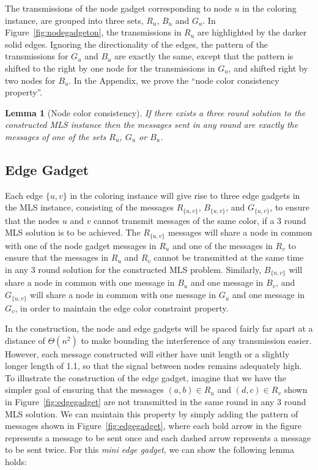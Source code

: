\documentclass{article}
\newtheorem{lemma}{Lemma}
\begin{document}
The transmissions of the node gadget corresponding to node $u$ in the coloring instance, are grouped into three sets, $R_u$, $B_u$ and $G_u$. In Figure~\ref{fig:nodegadgeton}, the transmissions in $R_u$ are highlighted by the darker solid edges.  Ignoring the directionality of the edges, the pattern of the transmissions for $G_u$ and $B_u$ are exactly the same, except that the pattern is shifted to the right by one node for the transmissions in $G_u$, and shifted right by two nodes for $B_u$. In the Appendix, we prove the ``node color consistency property''.

\begin{lemma}[Node color consistency]
If there exists a three round solution to the constructed MLS instance then the messages sent in any round are exactly the messages of one of the sets $R_u$, $G_u$ or $B_u$.
\end{lemma}


\subsection{Edge Gadget}
Each edge $\{u,v\}$ in the coloring instance will give rise to three edge gadgets in the MLS instance, consisting of the messages $R_{\{u,v\}}$, $B_{\{u,v\}}$, and $G_{\{u,v\}}$, to ensure that the nodes $u$ and $v$ cannot transmit messages of the same color, if a 3 round MLS solution is to be achieved.  The $R_{\{u,v\}}$ messages will share a node in common with one of the node gadget messages in $R_u$ and one of the messages in $R_v$ to ensure that the messages in $R_u$ and $R_v$ cannot be transmitted at the same time in any 3 round solution for the constructed MLS problem.  Similarly, $B_{\{u,v\}}$ will share a node in common with one message in $B_u$ and one message in $B_v$, and $G_{\{u,v\}}$ will share a node in common with one message in $G_u$ and one message in $G_v$, in order to maintain the edge color constraint property.

In the construction, the node and edge gadgets will be spaced fairly far apart at a distance of $\Theta( n^2 )$ to make bounding the interference of any transmission easier.  However, each message constructed will either have unit length or a slightly longer length of 1.1, so that the signal between nodes remains adequately high.  To illustrate the construction of the edge gadget, imagine that we have the simpler goal of ensuring that the messages $(a,b)\in R_u$ and $(d,c)\in R_v$ shown in Figure~\ref{fig:edgegadget} are not transmitted in the same round in any 3 round MLS solution.  We can maintain this property by simply adding the pattern of messages shown in Figure~\ref{fig:edgegadget}, where each bold arrow in the figure represents a message to be sent once and each dashed arrow represents a message to be sent twice.  For this \emph{mini edge gadget}, we can show the following lemma holds:
\end{document}
